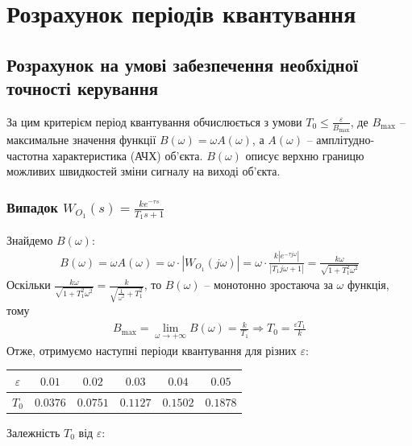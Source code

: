 \chapter{Розрахунок періодів квантування}
\section{Розрахунок на умові забезпечення необхідної точності керування}
За цим критерієм період квантування обчислюється з умови $T_0 \leq \frac{\varepsilon}{B_{\max}}$,
де $B_{\max}$ -- максимальне значення функції $B(\omega) = \omega A(\omega)$, а $A(\omega)$ --
амплітудно-частотна характеристика (АЧХ) об'єкта.
$B(\omega)$ описує верхню границю можливих швидкостей зміни сигналу на виході об'єкта.
\subsection{Випадок \texorpdfstring{$W_{O_1}(s) = \frac{k e^{-\tau s}}{T_1 s + 1}$}{1}}
Знайдемо $B(\omega)$:
\begin{gather}
    B(\omega) = \omega A(\omega) = \omega \cdot \left| W_{O_1}(j \omega)\right| = 
    \omega \cdot \frac{
        k \left| e^{-\tau j \omega}\right|
    }{
        \left|T_1 j \omega + 1\right|
    } = \frac{k \omega}{\sqrt{1 + T_1^2 \omega^2}}
\end{gather}
Оскільки $\frac{k\omega}{\sqrt{1 + T_1^2 \omega^2}} = \frac{k}{\sqrt{\frac{1}{\omega^2} + T_1^2}}$,
то $B(\omega)$ -- монотонно зростаюча за $\omega$ функція, тому 
\begin{gather}
    B_{\max} = \lim_{\omega\to+\infty} B(\omega) = \frac{k}{T_1} \Rightarrow T_0 = \frac{\varepsilon T_1}{k}
\end{gather}
Отже, отримуємо наступні періоди квантування для різних $\varepsilon$:
\begin{center}
    \begin{tabular}{|c|c|c|c|c|c|}
        \hline
        $\varepsilon$ & $0.01$ & $0.02$ & $0.03$ & $0.04$ & $0.05$ \\
        \hline
        $T_0$ & $0.0376$ & $0.0751$ & $0.1127$ & $0.1502$ & $0.1878$ \\
        \hline
    \end{tabular}
\end{center}
Залежність $T_0$ від $\varepsilon$:
